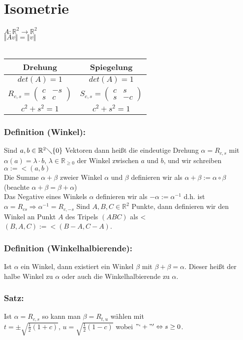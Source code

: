\section{Isometrie}
$A: \mathbb{R}^{2} \rightarrow \mathbb{R}^{2}$\\
$\Vert Av \Vert = \Vert v \Vert$\\
\qquad\\
 \begin{tabular}{c|c}
 	Drehung & Spiegelung \\ \hline
  	$det(A) = 1$ & $det(A) = 1$ \\ 
  	$R_{c,s}=\begin{pmatrix} c & -s \\ s & c \end{pmatrix}$ & $S_{c,s} = \begin{pmatrix} c & s \\ s & -c \end{pmatrix}$\\
 	$c^{2}+s^{2} = 1$ & $c^{2}+s^{2} = 1$\\
 \end{tabular}
 \subsubsection{Definition (Winkel):}
 Sind $a,b \in \mathbb{R}^{2}\diagdown \{0\}$ Vektoren dann heißt die eindeutige Drehung $\alpha =R_{c,s}$ mit $\alpha(a)=\lambda\cdot b, \, \lambda \in \mathbb{R}_{\geq 0}$ der Winkel zwischen $a$ und $b$, und wir schreiben $\alpha := < (a,b)$\\
 Die Summe $\alpha + \beta$ zweier Winkel $\alpha$ und $\beta$ definieren wir als $\alpha + \beta := \alpha \circ \beta$ (beachte $\alpha + \beta = \beta + \alpha$)\\
 Das Negative eines Winkels $\alpha$ definieren wir als $-\alpha := \alpha ^{-1}$ d.h. ist $\alpha = R_{cs} \Rightarrow \alpha^{-1} = R_{c,-s}$ Sind $A,B,C \in \mathbb{R}^{2}$ Punkte, dann definieren wir den Winkel an Punkt $A$ des Tripels $(ABC)$ als < $(B,A,C) := < (B-A,C-A)$. 
 \subsubsection{Definition (Winkelhalbierende):}
 Ist $\alpha$ ein Winkel, dann existiert ein Winkel $\beta$ mit $\beta + \beta = \alpha$. Dieser heißt der halbe Winkel zu $\alpha$ oder auch die Winkelhalbierende zu $\alpha$.
 \subsubsection{Satz:}
 Ist $\alpha = R_{c,s}$ so kann man $\beta = R_{t,u}$ wählen mit \\
 $t = \pm \sqrt{\frac{1}{2}(1+c)}, \, u=\sqrt{\frac{1}{2}(1-c)}$ wobei $"`+"' \Leftrightarrow s \geq 0$. 
